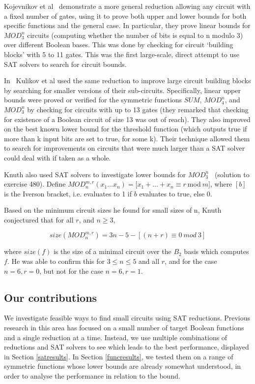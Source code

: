 \documentclass{article}
\begin{document}
Kojevnikov et al~\cite{kulikov} demonstrate a more general reduction allowing any circuit with a fixed number of gates, using it to prove both upper and lower bounds for both specific functions and the general case. In particular, they prove linear bounds for \(MOD^n_3\) circuits (computing whether the number of bits is equal to n modulo 3) over different Boolean bases. This was done by checking for circuit `building blocks' with 5 to 11 gates. This was the first large-scale, direct attempt to use SAT solvers to search for circuit bounds.

In~\cite{kulikovlocal} Kulikov et al used the same reduction to improve large circuit building blocks by searching for smaller versions of their sub-circuits. Specifically, linear upper bounds were proved or verified for the symmetric functions \(SUM\), \(MOD^n_4\), and \(MOD^n_3\) by checking for circuits with up to 13 gates (they remarked that checking for existence of a Boolean circuit of size 13 was out of reach). They also improved on the best known lower bound for the threshold function (which outputs true if more than k input bits are set to true, for some k). Their technique allowed them to search for improvements on circuits that were much larger than a SAT solver could deal with if taken as a whole.

Knuth also used SAT solvers to investigate lower bounds for \(MOD^n_3\)~\cite{knuth15} (solution to exercise 480). Define $MOD^{m,r}_n(x_1 \ldots x_n) = [x_1 + \ldots + x_n \equiv r \ $mod$ \ m]$, where $[b]$ is the Iverson bracket, i.e. evaluates to 1 if $b$ evaluates to true, else 0.

Based on the minimum circuit sizes he found for small sizes of n, Knuth conjectured that for all $r$, and $n \geq 3$,

\[
  size(MOD^{m,r}_n) = 3n - 5 - [(n+r) \equiv 0 \ mod \ 3]  
\]

where $size(f)$ is the size of a minimal circuit over the $B_2$ basis which computes $f$. He was able to confirm this for $3 \leq n \leq 5$ and all $r$, and for the case $n=6, r=0$, but not for the case $n=6, r=1$.

\subsection{Our contributions}

We investigate feasible ways to find small circuits using SAT reductions. Previous research in this area has focused on a small number of target Boolean functions and a single reduction at a time. Instead, we use multiple combinations of reductions and SAT solvers to see which leads to the best performance, displayed in Section \ref{satresults}. In Section \ref{funcresults}, we tested them on a range of symmetric functions whose lower bounds are already somewhat understood, in order to analyse the performance in relation to the bound. 
\end{document}
